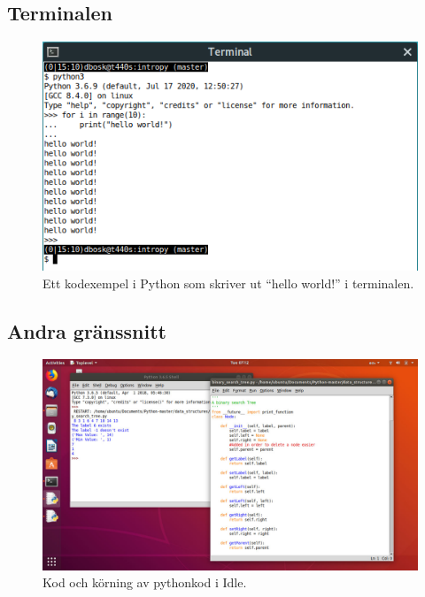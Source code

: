 \subsection{Terminalen}

\begin{frame}
  \begin{figure}
    \centering
    \includegraphics[height=0.8\textheight]{figs/python-terminal.png}
    \caption{Ett kodexempel i Python som skriver ut \enquote{hello world!} i 
    terminalen.}
  \end{figure}
\end{frame}


\subsection{Andra gränssnitt}

\begin{frame}
  \begin{figure}
    \centering
    \includegraphics[height=0.8\textheight]{figs/idle.jpg}
    \caption{Kod och körning av pythonkod i Idle.}
  \end{figure}
\end{frame}

